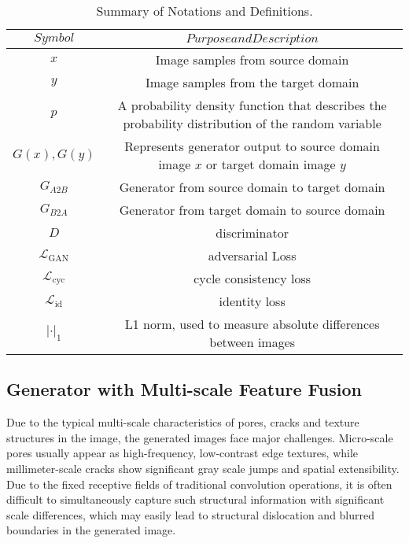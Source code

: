 \documentclass[a4paper,fleqn]{cas-sc}
\begin{document}
\begin{table}
	\centering
	\caption{Summary of Notations and Definitions.}
	\label{tab:Table1}
	\begin{tabular}{ |c||c|} 
		\hline
		 $Symbol$  &  $Purpose and Description$ \\ 
		\hline 
		\hline
		$x$ & Image samples from source domain  \\
		\hline
		$y$ & Image samples from the target domain  \\
		\hline
		$p$ & A probability density function that describes the probability distribution of the random variable \\
		\hline
		$G(x), G(y)$ & Represents generator output to source domain image $x$ or target domain image $y$ \\
		\hline
		$G_{A2B}$ & Generator from source domain to target domain  \\
		\hline
		$G_{B2A}$ & Generator from target domain to source domain  \\
		\hline
		$D$   & discriminator  \\
		\hline
		$\mathcal{L}_{\mathrm{GAN}}$  & adversarial Loss  \\
		\hline
		$\mathcal{L}_{\mathrm{cyc}}$   & cycle consistency loss  \\
		\hline
		$\mathcal{L}_{\mathrm{id}}$   & identity  loss   \\
	
		\hline
	$| \cdot |_1$ & L1 norm, used to measure absolute differences between images \\
		\hline
	\end{tabular} 
\end{table}




\subsection{Generator with Multi-scale Feature Fusion}

Due to the typical multi-scale characteristics of pores, cracks and texture structures in the image, the generated images face major challenges. Micro-scale pores usually appear as high-frequency, low-contrast edge textures, while millimeter-scale cracks show significant gray scale jumps and spatial extensibility. Due to the fixed receptive fields of traditional convolution operations, it is often difficult to simultaneously capture such structural information with significant scale differences, which may easily lead to structural dislocation and blurred boundaries in the generated image.
\end{document}
